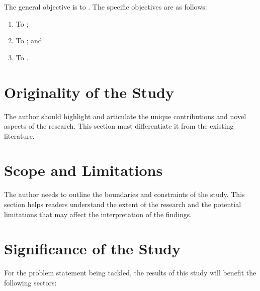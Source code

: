     \par The general objective is to . The specific objectives are as follows:
    
    \begin{enumerate}
    	\item To ;
    	\item To ; and
    	\item To .
    \end{enumerate}


\section{Originality of the Study}
\label{sec:Originality of the Study}

    The author should highlight and articulate the unique contributions and novel aspects of the research. This section must differentiate it from the existing literature.



\section{Scope and Limitations}
    \label{sec:Scope and Limitations}

    The author needs to outline the boundaries and constraints of the study. This section helps readers understand the extent of the research and the potential limitations that may affect the interpretation of the findings.


    
\section{Significance of the Study}
    \label{sec:Significance of the Study}

    For the problem statement being tackled, the results of this study will benefit the following sectors:
    
